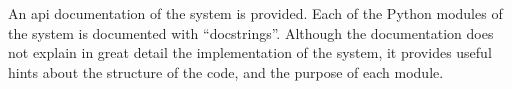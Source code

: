 
An \gls{api} documentation of the system is
provided.
Each of the Python modules of the system is documented with
``docstrings''.
Although the documentation does not explain in great detail
the implementation of the system, it provides useful hints
about the structure of the code, and the purpose of each
module.
